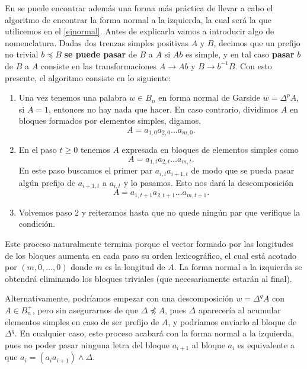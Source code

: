 \documentclass[bibtex, anon]{TEMat-article}
\begin{document}
En \cite{Thurston} se puede encontrar además una forma más práctica de llevar a cabo el algoritmo de encontrar la forma normal a la izquierda, la cual será la que utilicemos en el \cref{ejnormal}. Antes de explicarla vamos a introducir algo de nomenclatura. Dadas dos trenzas simples positivas $A$ y $B$, decimos que un prefijo no trivial $b\preccurlyeq B$ \textbf{se puede pasar} de $B$ a $A$ si $Ab$ es simple, y en tal caso \textbf{pasar} $b$ de $B$ a $A$ consiste en las transformaciones $A\to Ab$ y $B\to b^{-1}B$. Con esto presente, el algoritmo consiste en lo siguiente:
\begin{enumerate}
	\item Una vez tenemos una palabra $w\in B_n$ en forma normal de Garside $w=\Delta^p A$, si $A=1$, entonces no hay nada que hacer. En caso contrario, dividimos $A$ en bloques formados por elementos simples, digamos, $$A=a_{1,0}a_{2,0}\dots a_{m,0}.$$
	\item En el paso $t\geq 0$ tenemos $A$ expresada en bloques de elementos simples como
	$$A=a_{1,t}a_{2,t}\dots a_{m,t}.$$
	En este paso buscamos el primer par $a_{i,t}a_{i+1,t}$ de modo que se pueda pasar algún prefijo de $a_{i+1,t}$ a $a_{i,t}$ y lo pasamos. Esto nos dará la descomposición 
	$$A=a_{1,t+1}a_{2,t+1}\dots a_{m,t+1}.$$
	\item Volvemos paso 2 y reiteramos hasta que no quede ningún par que verifique la condición. 
\end{enumerate} 

Este proceso naturalmente termina porque el vector formado por las longitudes de los bloques aumenta en cada paso su orden lexicográfico, el cual está acotado por $(m,0,\dots, 0)$ donde $m$ es la longitud de $A$. La forma normal a la izquierda se obtendrá eliminando los bloques triviales (que necesariamente estarán al final). %

Alternativamente, podríamos empezar con una descomposición $w=\Delta^qA$ con $A\in B_n^+$, pero sin asegurarnos de que $\Delta \not\preccurlyeq A$, pues $\Delta$ aparecería al acumular elementos simples en caso de ser prefijo de $A$, y podríamos enviarlo al bloque de $\Delta^q$. En cualquier caso, este proceso acabará con la forma normal a la izquierda, pues no poder pasar ninguna letra del bloque $a_{i+1}$ al bloque $a_i$ es equivalente a que $a_i=(a_ia_{i+1})\land \Delta$. 
\end{document}

